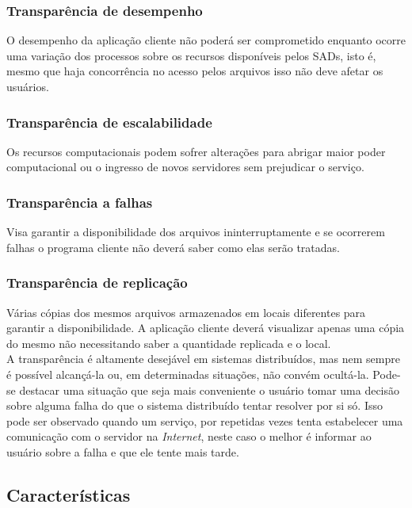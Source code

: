 	\subsubsection{Transparência de desempenho} O desempenho da aplicação cliente não poderá ser comprometido enquanto ocorre uma variação dos processos sobre os recursos disponíveis pelos SADs, isto é, mesmo que haja concorrência no acesso pelos arquivos isso não deve afetar os usuários.
	
	\subsubsection{Transparência de escalabilidade} Os recursos computacionais podem sofrer alterações para abrigar maior poder computacional ou o ingresso de novos servidores sem prejudicar o serviço.
	
	\subsubsection{Transparência a falhas} Visa garantir a disponibilidade dos arquivos ininterruptamente e se ocorrerem falhas o programa cliente não deverá saber como elas serão tratadas.
	
	\subsubsection{Transparência de replicação} Várias cópias dos mesmos arquivos armazenados em locais diferentes para garantir a disponibilidade. A aplicação cliente deverá
	visualizar apenas uma cópia do mesmo não necessitando saber a quantidade replicada e o local.
	\\
	
	A transparência é altamente desejável em sistemas distribuídos, mas nem sempre é possível alcançá-la ou, em determinadas situações, não convém ocultá-la. Pode-se destacar uma situação que seja mais conveniente o usuário tomar uma decisão sobre
	alguma falha do que o sistema distribuído tentar resolver por si só. Isso pode ser observado quando um serviço, por repetidas vezes tenta estabelecer uma comunicação com o servidor na \textit{Internet}, neste caso o melhor é informar ao usuário sobre a falha e que ele tente mais tarde.
	
	
	
	\subsection{Características}
	
